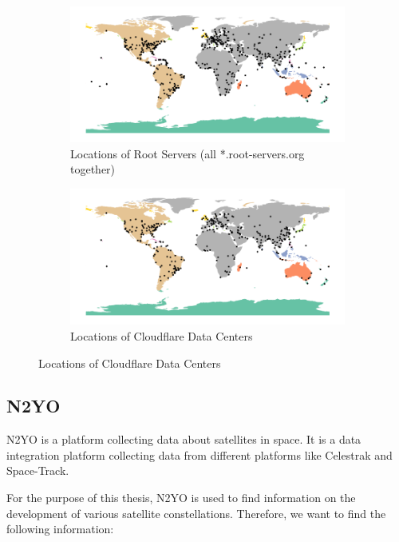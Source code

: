 \begin{figure}
	\begin{subfigure}[t]{0.48\textwidth}
		\includegraphics[width=\textwidth]{./chapters/3-methodology/img/rootserver-locations.png}
		\caption{Locations of Root Servers (all *.root-servers.org
			together) \cite{rootservers092024}}
	\end{subfigure}
	\begin{subfigure}[t]{0.48\textwidth}
		\includegraphics[width=\textwidth]{./chapters/3-methodology/img/cloudflare-datacenter-locations.png}
		\caption{Locations of Cloudflare Data Centers
			\cite{CloudflareGlobalNetwork2024}}
	\end{subfigure}
\end{figure}

\subsection{N2YO} \label{sec:n2yo}

N2YO is a platform collecting data about satellites in space. It is a data
integration platform collecting data from different platforms like Celestrak
and Space-Track.

For the purpose of this thesis, N2YO is used to find information on the
development of various satellite constellations. Therefore, we want to find the
following information:

